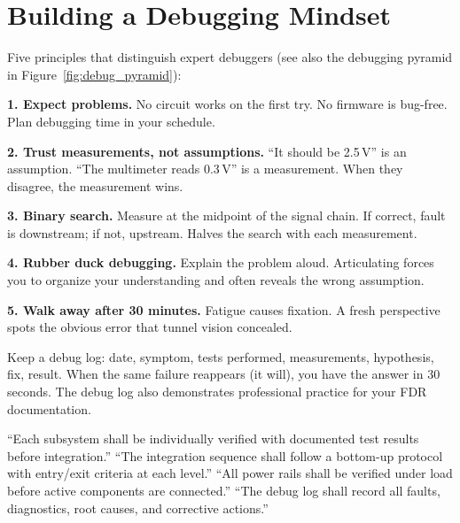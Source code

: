 \documentclass[11pt,letterpaper,twoside,openany]{book}
\begin{document}
\section{Building a Debugging Mindset}

Five principles that distinguish expert debuggers (see also the debugging pyramid in Figure~\ref{fig:debug_pyramid}):

\textbf{1. Expect problems.} No circuit works on the first try. No firmware is bug-free. Plan debugging time in your schedule.

\textbf{2. Trust measurements, not assumptions.} ``It should be 2.5\,V'' is an assumption. ``The multimeter reads 0.3\,V'' is a measurement. When they disagree, the measurement wins.

\textbf{3. Binary search.} Measure at the midpoint of the signal chain. If correct, fault is downstream; if not, upstream. Halves the search with each measurement.

\textbf{4. Rubber duck debugging.} Explain the problem aloud. Articulating forces you to organize your understanding and often reveals the wrong assumption.

\textbf{5. Walk away after 30 minutes.} Fatigue causes fixation. A fresh perspective spots the obvious error that tunnel vision concealed.

\begin{warningbox}
Keep a debug log: date, symptom, tests performed, measurements, hypothesis, fix, result. When the same failure reappears (it will), you have the answer in 30 seconds. The debug log also demonstrates professional practice for your FDR documentation.
\end{warningbox}

\begin{keyconceptbox}
``Each subsystem shall be individually verified with documented test results before integration.'' ``The integration sequence shall follow a bottom-up protocol with entry/exit criteria at each level.'' ``All power rails shall be verified under load before active components are connected.'' ``The debug log shall record all faults, diagnostics, root causes, and corrective actions.''
\end{keyconceptbox}
\end{document}
